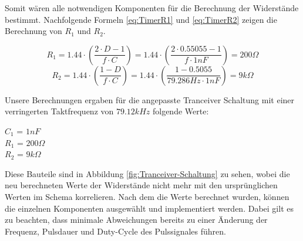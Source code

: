 Somit wären alle notwendigen Komponenten für die Berechnung der Widerstände bestimmt. Nachfolgende Formeln \ref{eq:TimerR1} und \ref{eq:TimerR2} zeigen die Berechnung von $R_{1}$ und $R_{2}$.

\begin{equation}\label{eq:TimerR1}
R_{1} = 1.44 \cdot \left( \dfrac{2 \cdot D - 1}{f \cdot C} \right)
= 1.44 \cdot \left( \dfrac{2 \cdot 0.55055 - 1}{f \cdot 1nF} \right) = 200\Omega
\end{equation}
\begin{equation}\label{eq:TimerR2}
R_{2} = 1.44 \cdot \left( \dfrac{1-D}{f \cdot C} \right) = 1.44 \cdot \left( \dfrac{1-0.5055}{79.286Hz \cdot 1nF} \right) = 9k\Omega
\end{equation}


Unsere Berechnungen ergaben für die angepasste Tranceiver Schaltung mit einer verringerten Taktfrequenz von $79.12 kHz$ folgende Werte:

\begin{center}
$C_{1}$ = $1nF$\\
$R_{1}$ = $200\Omega$\\
$R_{2}$ = $9k\Omega$\\
\end{center}

Diese Bauteile sind in Abbildung \ref{fig:Tranceiver-Schaltung} zu sehen, wobei die neu berechneten Werte der Widerstände nicht mehr mit den ursprünglichen Werten im Schema korrelieren.
Nach dem die Werte berechnet wurden, können die einzelnen Komponenten ausgewählt und implementiert werden. Dabei gilt es zu beachten, dass minimale Abweichungen bereits zu einer Änderung der Frequenz, Pulsdauer und Duty-Cycle des Pulssignales führen.

